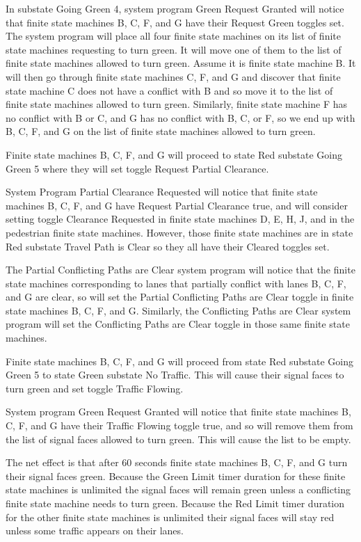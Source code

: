 \documentclass[letterpaper,twoside]{article}
\begin{document}
In substate Going Green 4, system program Green Request Granted will notice
that finite state machines B, C, F, and G have their Request Green toggles
set.
The system program will place all four finite state machines on its list of
finite state machines requesting to turn green.
It will move one of them to the list of finite state machines allowed to
turn green.  Assume it is finite state machine B.
It will then go through finite state machines C, F, and G
and discover that finite state machine C does not have
a conflict with B and so move it to the list of finite state machines
allowed to turn green.  Similarly, finite state machine F has no conflict
with B or C, and G has no conflict with B, C, or F, so we end up with
B, C, F, and G on the list of finite state machines allowed to turn green.

Finite state machines B, C, F, and G will proceed to state Red
substate Going Green 5 where they will set toggle Request Partial Clearance.

System Program Partial Clearance Requested will notice that finite state
machines B, C, F, and G have Request Partial Clearance true,
and will consider setting toggle Clearance Requested in finite state machines
D, E, H, J, and in the pedestrian finite state machines.
However, those finite state machines
are in state Red substate Travel Path is Clear so they all have their
Cleared toggles set.

The Partial Conflicting Paths are Clear system program will notice that the
finite state machines corresponding to lanes that partially conflict with
lanes B, C, F, and G are clear, so will set the
Partial Conflicting Paths are Clear toggle in finite state machines
B, C, F, and G.
Similarly, the Conflicting Paths are Clear system program will set
the Conflicting Paths are Clear toggle in those same finite state machines.

Finite state machines B, C, F, and G will proceed from state Red substate
Going Green 5 to state Green substate No Traffic.
This will cause their signal faces to turn green and set toggle
Traffic Flowing.

System program Green Request Granted will notice that finite state machines
B, C, F, and G have their Traffic Flowing toggle true,
and so will remove them from the list of signal faces allowed to turn green.
This will cause the list to be empty.

The net effect is that after 60 seconds finite state machines
B, C, F, and G turn their signal faces green.
Because the Green Limit timer duration for these finite state machines
is unlimited the signal faces  will remain green unless
a conflicting finite state machine needs to turn green.  Because the Red Limit
timer duration for the other finite state machines is unlimited
their signal faces will stay red unless some traffic appears on their lanes.
\end{document}
